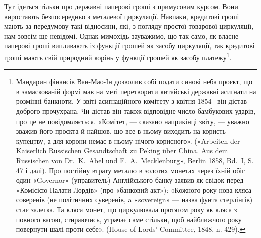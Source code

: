 Тут ідеться тільки про державні паперові гроші з примусовим
курсом. Вони виростають безпосередньо з металевої циркуляції.
Навпаки, кредитові гроші мають за передумову такі відносини,
які, з погляду простої товарової циркуляції, нам зовсім ще невідомі.
Однак мимохідь зауважимо, що так само, як власне паперові
гроші випливають із функції грошей як засобу циркуляції,
так кредитові гроші мають свій природний корінь у функції
грошей як засобу платежу\footnote{
Мандарин фінансів Ван-Мао-Ін дозволив собі подати синові
неба проєкт, що в замаскованій формі мав на меті перетворити китайські
державні асиґнати на розмінні банкноти. У звіті асиґнаційного комітету
з квітня 1854~ він дістав доброго прочухрана. Чи дістав він також відповідне
число бамбукових ударів, про це не повідомляється. «Комітет, —
сказано наприкінці звіту, — уважно зважив його проєкта й найшов, що
все в ньому виходить на користь купецтву, а для корони немає в ньому
нічого корисного». («Arbeiten der Kaiserlich Russischen Gesandtschaft zu
Peking über China. Aus dem Russischen von Dr.~K.~Abel und F.~A.~Mecklenburg»,
Berlin 1858, Bd.~I, S. 47 і далі). Про постійну втрату металю в
золотих монетах через їхній обіг один «Governor» (управитель) Англійського
банку заявив як свідок перед «Комісією Палати Лордів» (про
«банковий акт»): «Кожного року нова кляса соверенів (не політичних
суверенів, a «sovereign» — назва фунта стерлінґів) стає залегка. Та кляса
монет, що циркулювала протягом року як кляса з повного вагою, стираючись,
утрачає саме стільки, щоб найближчого року повернути шалі
проти себе». (House of Lords’ Committee, 1848, n. 429).
}.

